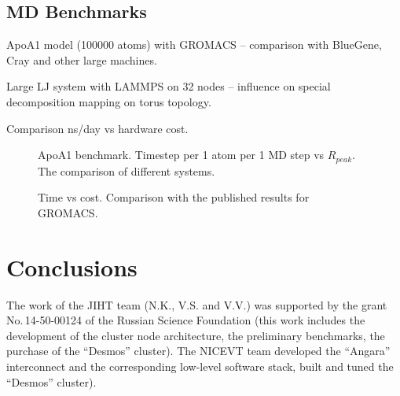 \documentclass{llncs}
\begin{document}
\subsection{MD Benchmarks}

ApoA1 model (100000 atoms) with GROMACS – comparison with BlueGene, Cray and other large machines.

Large LJ system with LAMMPS on 32 nodes – influence on special decomposition mapping on torus topology.

Comparison ns/day vs hardware cost.

\begin{figure}[h]
\centering
\caption{ApoA1 benchmark. Timestep per 1 atom per 1 MD step vs $R_{peak}$. The comparison of different systems.}
\end{figure}

\begin{figure}[h]
\centering
\caption{Time vs cost. Comparison with the published results for GROMACS.}
\end{figure}


\section{Conclusions}

The work of the JIHT team (N.K., V.S. and V.V.) was supported by the grant No.\,14-50-00124 of the Russian Science Foundation (this work includes the development of the cluster node architecture, the preliminary benchmarks, the purchase of the ``Desmos'' cluster). The NICEVT team developed the ``Angara'' interconnect and the corresponding low-level software stack, built and tuned the ``Desmos'' cluster).



\end{document}
